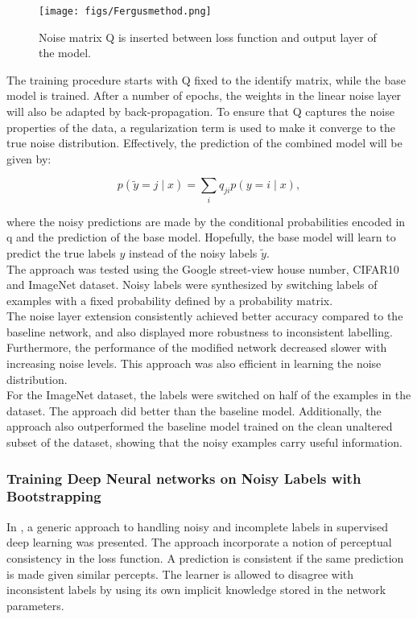 \begin{figure}
\begin{center}
\texttt{[image: figs/Fergusmethod.png]}
\caption[Noise matrix Q]{Noise matrix Q is inserted between loss function and output layer of the model. }
\label{fig:fergus_method}
\end{center}
\end{figure}

The training procedure starts with Q fixed to the identify matrix, while the base model is trained. After a number of epochs, the weights in the linear noise layer will also be adapted by back-propagation. To ensure that Q captures the noise properties of the data, a regularization term is used to make it converge to the true noise distribution. Effectively, the prediction of the combined model will be given by:

$$p(\tilde{y} = j \mid x) = \sum_{i} q_{ji}p(y = i \mid x),$$ 

where the noisy predictions are made by the conditional probabilities encoded in q and the prediction of the base model. Hopefully, the base model will learn to predict the true labels $y$ instead of the noisy labels $\tilde{y}$.  \\

The approach was tested using the Google street-view house number, CIFAR10 and ImageNet dataset. Noisy labels were synthesized by switching labels of examples with a fixed probability defined by a probability matrix. \\

The noise layer extension consistently achieved better accuracy compared to the baseline network, and also displayed more robustness to inconsistent labelling. Furthermore, the performance of the modified network decreased slower with increasing noise levels. This approach was also efficient in learning the noise distribution. \\

For the ImageNet dataset, the labels were switched on half of the examples in the dataset. The approach did better than the baseline model. Additionally, the approach also outperformed the baseline model trained on the clean unaltered subset of the dataset, showing that the noisy examples carry useful information.


\subsubsection{Training Deep Neural networks on Noisy Labels with Bootstrapping}
In \cite{Reed_noisy_labels_bootstrapping}, a generic approach to handling noisy and incomplete labels in supervised deep learning was presented. The approach incorporate a notion of perceptual consistency in the loss function. A prediction is consistent if the same prediction is made given similar percepts. The learner is allowed to disagree with inconsistent labels by using its own implicit knowledge stored in the network parameters.\\ 


